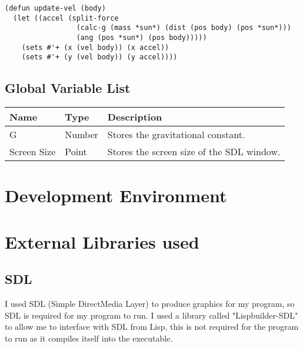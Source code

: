 \begin{lstlisting}
(defun update-vel (body)
  (let ((accel (split-force 
                 (calc-g (mass *sun*) (dist (pos body) (pos *sun*)))
                 (ang (pos *sun*) (pos body)))))
    (sets #'+ (x (vel body)) (x accel))
    (sets #'+ (y (vel body)) (y accel))))
\end{lstlisting}

\subsection{Global Variable List}
\begin{tabular}{|p{}|p{}|p{}|}
	\hline
	Name & Type & Description \\ \hline
	G & Number & Stores the gravitational constant.\\
	Screen Size & Point & Stores the screen size of the SDL window.
	


	
\end{tabular}

\section{Development Environment}

\section{External Libraries used}
\subsection{SDL}
I used SDL (Simple DirectMedia Layer) to produce graphics for my program, so SDL
is required for my program to run. I used a library called "Lispbuilder-SDL" to
allow me to interface with SDL from Lisp, this is not required for the program
to run as it compiles itself into the executable.
